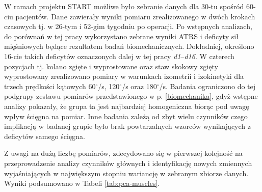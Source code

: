 W ramach projektu START możliwe było zebranie danych dla 30-tu spośród 60-ciu pacjentów. Dane zawierały wyniki pomiaru zrealizowanego w dwóch krokach czasowych tj. w 26-tym i 52-gim tygodniu po operacji. Po wstępnych analizach, do porównań w tej pracy wykorzystano zebrane wyniki ATRS i deficyty sił mięśniowych będące rezultatem badań biomechanicznych. Dokładniej, określono 16-cie takich deficytów oznaczonych dalej w tej pracy \textit{d1}--\textit{d16}. W czterech pozycjach tj. kolano zgięte i wyprostowane oraz staw skokowy zgięty wyprostowany zrealizowano pomiary w warunkach izometrii i izokinetyki dla trzech prędkości kątowych 60$^\circ$/s, 120$^\circ$/s oraz 180$^\circ$/s. Badania ograniczono do tej podgrupy zestawu pomiarów przedstawionego w p. \ref{biomechanika}, gdyż wstępne analizy pokazały, że grupa ta jest najbardziej homogeniczna biorąc pod uwagę wpływ ścięgna na pomiar. Inne badania zależą od zbyt wielu czynników czego implikacją w badanej grupie było brak powtarzalnych wzorców wynikających z deficytów samego ścięgna.  

Z uwagi na dużą liczbę pomiarów, zdecydowano się w pierwszej kolejność \linebreak na przeprowadzenie analizy czynników głównych i identyfikację nowych zmiennych wyjaśniających w największym stopniu wariancję w zebranym zbiorze danych. Wyniki podsumowano w Tabeli \ref{tab:pca-muscles}.

